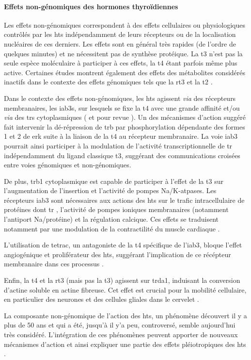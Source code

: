 \documentclass[../main.tex]{subfiles}
\begin{document}
\paragraph{Effets non-génomiques des hormones thyroïdiennes}
Les effets non-génomiques correspondent à des effets cellulaires ou physiologiques contrôlés par les \glspl{ht} indépendamment de leurs récepteurs ou de la localisation nucléaires de ces derniers.
Les effets sont en général très rapides (de l'ordre de quelques minutes) et ne nécessitent pas de synthèse protéique.
La \gls{t3} n'est pas la seule espèce moléculaire à participer à ces effets, la \gls{t4} étant parfois même plus active.
Certaines études montrent également des effets des métabolites considérés inactifs dans le contexte des effets génomiques tels que la \gls{rt3} \citep{Siegrist-Kaiser1990} et la \gls{t2} \citep{Lombardi1998}.
\par
Dans le contexte des effets non-génomiques, les \glspl{ht} agissent \textit{via} des récepteurs membranaires, les \glspl{iab3}, sur lesquels se fixe la \gls{t4} avec une grande affinité et/ou \textit{via} des \glspl{tr} cytoplasmiques (\citealp{Bergh2005} et pour revue \citealp{Davis2008}).
Un des mécanismes d'action suggéré fait intervenir la dé-répression de \gls{trb} par phosphorylation dépendante des formes 1 et 2 de \gls{erk} \citep{Davis2000} suite à la liaison de la \gls{t4} au récepteur membranaire.
La voie \gls{iab3} pourrait ainsi participer à la modulation de l'activité transcriptionnelle de \gls{tr} indépendamment du ligand classique \gls{t3}, suggérant des communications croisées entre voies génomiques et non-génomiques.
\par
De plus, \gls{trb}1 cytoplasmique est capable de participer à l'effet de la \gls{t3} sur l'augmentation de l'insertion et l'activité de pompes \gls{Na}/\gls{K}-\gls{atp}ases.
Les récepteurs \gls{iab3} sont nécessaires aux actions des \glspl{ht} sur le trafic intracellulaire de protéines dont \gls{tr} \citep{Davis2005}, l'activité de pompes ioniques membranaires (notamment l'antiport \gls{Na}/protéine) et la régulation calcique.
Ces effets se traduisent notamment par une modulation de la contractilité du muscle cardiaque \citep{Davis2002}.
\par
L'utilisation de \gls{tetrac}, un antagoniste de la \gls{t4} spécifique de l'\gls{iab3}, bloque l'effet angiogénique et proliférateur des \glspl{ht}, suggérant l'implication de ce récépteur membranaire dans ces processus \citep{Davis2011}.
\par
Enfin, la \gls{t4} et la \gls{rt3} (mais pas la \gls{t3}) agissent sur \gls{trda}1, induisant la conversion d'actine soluble en actine fibreuse.
Cet effet est crucial pour la mobilité cellulaire, en particulier des neurones et des cellules gliales dans le cervelet \citep{Safran1993,Leonard2006}.
\par
La composante non-génomique de l'action des \glspl{ht}, un phénomène découvert il y a plus de 50 ans et qui a été, jusqu'à il y'a peu, controversé, semble aujourd'hui très considéré.
L'intégration de ces phénomènes peuvent apporter de nouveaux mécanismes d'action et ainsi expliquer une partie des effets pléiotropiques des \glspl{ht} \citep{Brix2011}.
\end{document}
